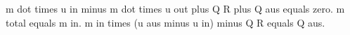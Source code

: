 m dot times u in minus m dot times u out plus Q R plus Q aus equals zero.  
m total equals m in.  
m in times (u aus minus u in) minus Q R equals Q aus.